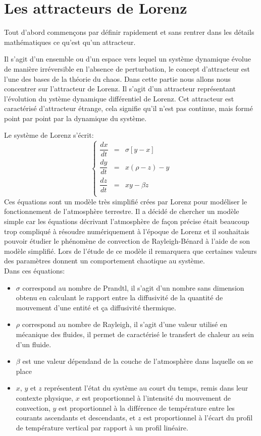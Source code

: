 \chapter{Les attracteurs de Lorenz}
Tout d’abord commençons par définir rapidement et sans rentrer dans les détails mathématiques ce qu’est qu'un attracteur.

Il s’agit d’un ensemble ou d’un espace vers lequel un système dynamique évolue de manière irréversible en l’absence de perturbation, le concept d’attracteur est l’une des bases de la théorie du chaos. Dans cette partie nous allons nous concentrer sur l’attracteur de Lorenz. Il s’agit d’un attracteur représentant l’évolution du ystème dynamique différentiel de Lorenz. Cet attracteur est caractérisé d'attracteur étrange, cela signifie qu'il n'est pas continue, mais formé point par point par la dynamique du système.

Le système de Lorenz s'écrit: 
\[
    \left\{
    \begin{array}{rcl}
        \dfrac{dx}{dt}&=&\sigma[y-x]\\
        \dfrac{dy}{dt}&=&x(\rho-z)-y\\
        \dfrac{dz}{dt}&=&xy-\beta z\\
    \end{array}
    \right.
\]
Ces équations sont un modèle très simplifié crées par Lorenz pour modéliser le fonctionnement 
de l’atmosphère terrestre. Il a décidé de chercher un modèle simple car 
les équations décrivant l’atmosphère de façon précise était beaucoup trop compliqué à résoudre numériquement à l’époque de Lorenz et il souhaitais pouvoir étudier  le phénomène de convection
de Rayleigh-Bénard à l’aide de son modèle simplifié. Lors de l'étude de ce modèle il remarquera que certaines valeurs des paramètres donnent un comportement
chaotique au système.\\


Dans ces équations:
\begin{itemize}
    \item $\sigma$ correspond au nombre de Prandtl, il s'agit d'un nombre sans dimension obtenu en calculant le rapport entre la diffusivité de la quantité de mouvement d'une entité et ça diffusivité thermique.
    \item $\rho$ correspond au nombre de Rayleigh, il s'agit d'une valeur utilisé en mécanique des fluides, il permet de caractérisé le transfert de chaleur au sein d'un fluide.
    \item $\beta $  est une valeur dépendand de la couche de l'atmosphère dans laquelle on se place
    \item $x$, $y$ et $z$ représentent l'état du système au court du temps, remis dans leur contexte physique, $x$ est proportionnel à l'intensité du mouvement de convection, $y$ est proportionnel à la différence de température entre les courants ascendants et descendants, et $z$ est proportionnel à l'écart du profil de température vertical par rapport à un profil linéaire.
\end{itemize}


